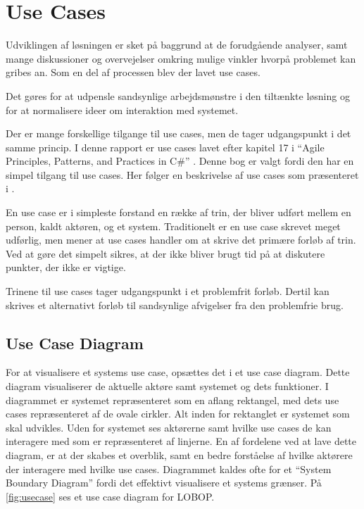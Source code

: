 \section{Use Cases}

Udviklingen af løsningen er sket på baggrund at de forudgående analyser, samt mange diskussioner og overvejelser omkring mulige vinkler hvorpå problemet kan gribes an. Som en del af processen blev der lavet use cases. 

Det gøres for at udpensle sandsynlige arbejdsmønstre i den tiltænkte løsning og for at normalisere ideer om interaktion med systemet.

Der er mange forskellige tilgange til use cases, men de tager udgangspunkt i det samme princip. I denne rapport er use cases lavet efter kapitel 17 i \enquote{Agile Principles, Patterns, and Practices in C\#} \cite{martin2006agile}. Denne bog er valgt fordi den har en simpel tilgang til use cases. Her følger en beskrivelse af use cases som præsenteret i \cite{martin2006agile}.

En use case er i simpleste forstand en række af trin, der bliver udført mellem en person, kaldt aktøren, og et system. Traditionelt er en use case skrevet meget udførlig, men \cite{martin2006agile} mener at use cases handler om at skrive det primære forløb af trin. Ved at gøre det simpelt sikres, at der ikke bliver brugt tid på at diskutere punkter, der ikke er vigtige. 

Trinene til use cases tager udgangspunkt i et problemfrit forløb. Dertil kan skrives et alternativt forløb til sandsynlige afvigelser fra den problemfrie brug.

\subsection{Use Case Diagram}

For at visualisere et systems use case, opsættes det i et use case diagram. Dette diagram visualiserer de aktuelle aktøre samt systemet og dets funktioner. I diagrammet er systemet repræsenteret som en aflang rektangel, med dets use cases repræsenteret af de ovale cirkler. Alt inden for rektanglet er systemet som skal udvikles. Uden for systemet ses aktørerne samt hvilke use cases de kan interagere med som er repræsenteret af linjerne. En af fordelene ved at lave dette diagram, er at der skabes et overblik, samt en bedre forståelse af hvilke aktørere der interagere med hvilke use cases. Diagrammet kaldes ofte for et \enquote{System Boundary Diagram} fordi det effektivt visualisere et systems grænser. På \cref{fig:usecase} ses et use case diagram for LOBOP.

